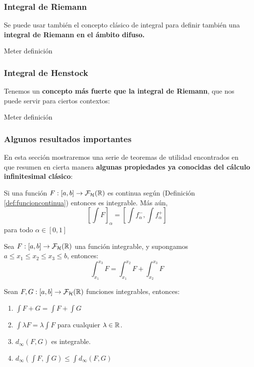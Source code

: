 \subsubsection{Integral de Riemann}
Se puede usar también el concepto clásico de integral para definir también una \textbf{integral de Riemann en el ámbito difuso.}

\begin{definicion}
  Meter definición
\end{definicion}

\subsubsection{Integral de Henstock}
Tenemos un \textbf{concepto más fuerte que la integral de Riemann}, que nos puede servir para ciertos contextos:
\begin{definicion}
  Meter definición
\end{definicion}

\subsubsection{Algunos resultados importantes}
En esta sección mostraremos una serie de teoremas de utilidad encontrados en \cite{integral2} que resumen en cierta manera \textbf{algunas propiedades ya conocidas del cálculo infinitesimal clásico}:

\begin{teorema}
  Si una función $F :  [a, b] \rightarrow \mathcal{F}_\mathcal{H}(\mathbb R)$ es continua según (Definición \ref{def:funcioncontinua}) entonces es integrable. Más aún,
  \[
  \left[
    \int F
    \right]_\alpha = \left[
    \int f_\alpha^-, \int f_\alpha^+
    \right]
  \] para todo $\alpha \in [0, 1]$
\end{teorema}

\begin{teorema}
  Sea $F :  [a, b] \rightarrow \mathcal{F}_\mathcal{H}(\mathbb R)$ una función integrable, y supongamos $a \leq x_1 \leq x_2 \leq x_3 \leq b$, entonces:
  \[
  \int_{x_1}^{x_3} F = \int_{x_1}^{x_2} F + \int_{x_2}^{x_3} F
  \]
\end{teorema}

\begin{teorema}
  Sean $F, G :  [a, b] \rightarrow \mathcal{F}_\mathcal{H}(\mathbb R)$ funciones integrables, entonces:
  
  \begin{enumerate}
  \item $\int F + G = \int F + \int G$
  \item $\int \lambda F = \lambda \int F$ para cualquier $\lambda \in \mathbb R$.
  \item $d_\infty(F, G)$ es integrable.
  \item $d_\infty(\int F, \int G) \leq \int d_\infty(F, G)$
  \end{enumerate}
\end{teorema}

